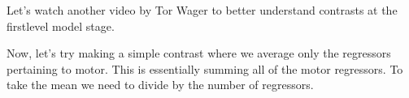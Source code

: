 \documentclass[letterpaper,10pt,english]{sphinxmanual}
\begin{document}
Let’s watch another video by Tor Wager to better understand contrasts at the first\sphinxhyphen{}level model stage.

\begin{sphinxVerbatim}[commandchars=\\\{\}]
\end{sphinxVerbatim}

\noindent{}

Now, let’s try making a simple contrast where we average only the regressors pertaining to motor. This is essentially summing all of the motor regressors. To take the mean we need to divide by the number of regressors.

\begin{sphinxVerbatim}[commandchars=\\\{\}]

  \PYG{p}{[}\PYG{p}{]}
\PYG{p}{[}\PYG{p}{[}\PYG{p}{]}\PYG{p}{]}  

  \PYG{p}{[}\PYG{p}{]}  

\end{sphinxVerbatim}
\end{document}
